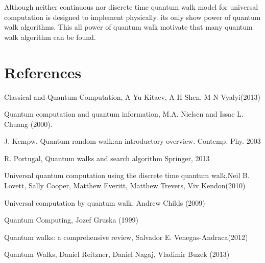 \documentclass[11 pt]{article}
\theoremstyle{definition}
\theoremstyle{remark}
\begin{document}
Although neither continuous nor discrete time quantum walk model for universal computation is designed to implement physically. its only show power of quantum walk algorithms. This all power of quantum walk motivate that many quantum walk algorithm can be found.

\newpage
\section{References}
\begin{enumerate}[label={[\arabic*]}]
    \item Classical and Quantum Computation, A Yu Kitaev, A H Shen, M N Vyalyi(2013)
    \item Quantum computation and quantum information, M.A. Nielsen and Issac L. Chuang (2000).
    \item J. Kempw. Quantum random walk:an introductory overview. Contemp. Phy. 2003
    \item R. Portugal, Quantum walks and search algorithm Springer, 2013
    \item Universal quantum computation using the discrete time quantum walk,Neil B. Lovett, Sally Cooper, Matthew Everitt, Matthew Trevers, Viv Kendon(2010)
    \item Universal computation by quantum walk, Andrew Childs (2009)
    \item Quantum Computing, Jozef Gruska (1999)
    \item Quantum walks: a comprehensive review, Salvador E. Venegas-Andraca(2012)
    \item Quantum Walks, Daniel Reitzner, Daniel Nagaj, Vladimir Buzek (2013)
\end{enumerate}
\end{document}
